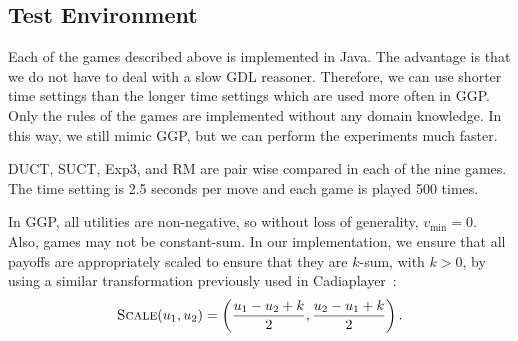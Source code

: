 \documentclass[conference]{IEEEtran}
\begin{document}
\subsection{Test Environment}
Each of the games described above is implemented in Java. The advantage is that we do not have to deal with a slow GDL reasoner. Therefore, we can use shorter time settings than the longer time settings which are used more often in GGP. Only the rules of the games are implemented without any domain knowledge. In this way, we still mimic GGP, but we can perform the experiments much faster. 

DUCT, SUCT, Exp3, and RM are pair wise compared in each of the nine games. The time setting is 2.5 seconds per move and each game is played 500 times.  

In GGP, all utilities are non-negative, so without loss of generality, $v_{\min} = 0$. 
Also, games may not be constant-sum. In our implementation, we ensure that all payoffs 
are appropriately scaled to ensure that they are $k$-sum, with $k > 0$, by using 
a similar transformation previously used in Cadiaplayer~\cite{Finnsson12}:
\[ \text{\sc Scale}(u_1, u_2) = \left( \frac{u_1 - u_2 + k}{2}, \frac{u_2 - u_1 + k}{2} \right). \]
\end{document}
